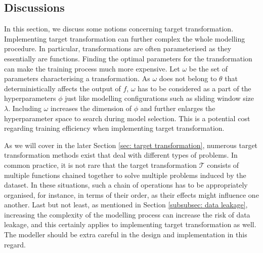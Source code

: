 \subsection{Discussions}
In this section, we discuss some notions concerning target transformation. Implementing target transformation can further complex the whole modelling procedure. In particular, transformations are often parameterised as they essentially are functions. Finding the optimal parameters for the transformation can make the training process much more expensive. Let $\omega$ be the set of parameters characterising a transformation. As $\omega$ does not belong to $\theta$ that deterministically affects the output of $f$, $\omega$ has to be considered as a part of the hyperparameters $\phi$ just like modelling configurations such as sliding window size $\lambda$. Including $\omega$ increases the dimension of $\phi$ and further enlarges the hyperparameter space to search during model selection. This is a potential cost regarding training efficiency when implementing target transformation.

As we will cover in the later Section \ref{sec: target transformation}, numerous target transformation methods exist that deal with different types of problems. In common practice, it is not rare that the target transformation $\mathcal{T}$ consists of multiple functions chained together to solve multiple problems induced by the dataset. In these situations, such a chain of operations has to be appropriately organised, for instance, in terms of their order, as their effects might influence one another. Last but not least, as mentioned in Section \ref{subsubsec: data leakage}, increasing the complexity of the modelling process can increase the risk of data leakage, and this certainly applies to implementing target transformation as well. The modeller should be extra careful in the design and implementation in this regard.
